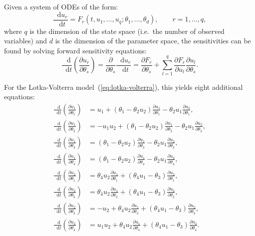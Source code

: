 \documentclass[11pt,a4paper]{report}
\newcommand*\diff{\mathop{}\!\mathrm{d}}
\begin{document}
Given a system of ODEs of the form:
$$\frac{\diff u_r}{\diff t} = F_r(t, u_1, \dots, u_q; \theta_1, \dots, \theta_d),\qquad r=1,\dots,q,$$
where $q$ is the dimension of the state space (i.e.\ the number of observed variables) and $d$ is the dimension of the parameter space,
the sensitivities can be found by solving forward sensitivity equations:
$$\frac{\diff}{\diff t}\left(\frac{\partial u_r}{\partial \theta_s}\right)
= \frac{\partial}{\partial \theta_s}\frac{\diff u_r}{\diff t} 
= \frac{\partial F_r}{\partial \theta_s} + \sum_{l=1}^q \frac{\partial F_r}{\partial u_l} \frac{\partial u_l}{\partial \theta_s}.$$


For the Lotka-Volterra model~(\ref{eq:lotka-volterra}), this yields eight additional equations:
\begin{equation*}
\begin{aligned}
\frac{\diff}{\diff t}\left(\frac{\partial u_1}{\partial \theta_1}\right) &= u_1 + (\theta_1 - \theta_2 u_2) \frac{\partial u_1}{\partial \theta_1} - \theta_2 u_1 \frac{\partial u_2}{\partial \theta_1}, \\
\frac{\diff}{\diff t}\left(\frac{\partial u_1}{\partial \theta_2}\right) &= - u_1 u_2 + (\theta_1 - \theta_2 u_2) \frac{\partial u_1}{\partial \theta_2} - \theta_2 u_1 \frac{\partial u_2}{\partial \theta_2}, \\
\frac{\diff}{\diff t}\left(\frac{\partial u_1}{\partial \theta_3}\right) &= (\theta_1 - \theta_2 u_2) \frac{\partial u_1}{\partial \theta_3} - \theta_2 u_1 \frac{\partial u_2}{\partial \theta_3}, \\
\frac{\diff}{\diff t}\left(\frac{\partial u_1}{\partial \theta_4}\right) &= (\theta_1 - \theta_2 u_2) \frac{\partial u_1}{\partial \theta_4} - \theta_2 u_1 \frac{\partial u_2}{\partial \theta_4}, \\
\frac{\diff}{\diff t}\left(\frac{\partial u_2}{\partial \theta_1}\right) &= \theta_4 u_2 \frac{\partial u_1}{\partial \theta_1} + (\theta_4 u_1 - \theta_3) \frac{\partial u_2}{\partial \theta_1}, \\
\frac{\diff}{\diff t}\left(\frac{\partial u_2}{\partial \theta_2}\right) &= \theta_4 u_2 \frac{\partial u_1}{\partial \theta_2} + (\theta_4 u_1 - \theta_3) \frac{\partial u_2}{\partial \theta_2}, \\
\frac{\diff}{\diff t}\left(\frac{\partial u_2}{\partial \theta_3}\right) &= -u_2 + \theta_4 u_2 \frac{\partial u_1}{\partial \theta_3} + (\theta_4 u_1 - \theta_3) \frac{\partial u_2}{\partial \theta_3}, \\
\frac{\diff}{\diff t}\left(\frac{\partial u_2}{\partial \theta_4}\right) &= u_1 u_2 + \theta_4 u_2 \frac{\partial u_1}{\partial \theta_4} + (\theta_4 u_1 - \theta_3) \frac{\partial u_2}{\partial \theta_4}. \\
\end{aligned}
\end{equation*}
\end{document}
